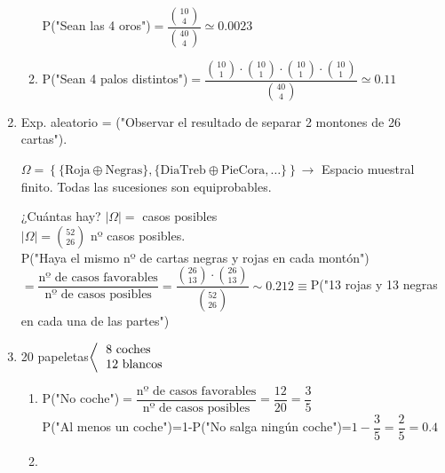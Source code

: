 \begin{enumerate}[label=\color{red}\textbf{\arabic*)}, leftmargin=*]
\begin{enumerate}[label=\color{red}\alph*)]
        P("Sean las 4 oros")$=\dfrac{\binom{10}{4}}{\binom{40}{4}}\simeq0.0023$
        \item {}
        
        P("Sean 4 palos distintos")$=\dfrac{\binom{10}{1}\cdot\binom{10}{1}\cdot\binom{10}{1}\cdot\binom{10}{1}}{\binom{40}{4}}\simeq0.11$
    \end{enumerate}
    \item {}
    
    Exp. aleatorio = ("Observar el resultado de separar 2 montones de 26 cartas").
    
    $\Omega=\left\{\{\text{Roja}\oplus\text{Negras}\},\{\text{DiaTreb}\oplus\text{PieCora},\dots\}\right\}\longrightarrow$ Espacio muestral finito. Todas las sucesiones son equiprobables. 
    
    ¿Cuántas hay? $|\Omega|=$ casos posibles\\
    $|\Omega|=\binom{52}{26}$ nº casos posibles.\\
    P("Haya el mismo nº de cartas negras y rojas en cada montón")$=\dfrac{\text{nº de casos favorables}}{\text{nº de casos posibles}}=\dfrac{\binom{26}{13}\cdot\binom{26}{13}}{\binom{52}{26}}\sim0.212\equiv$P("13 rojas y 13 negras en cada una de las partes")
    \item {}
    
    20 papeletas$\left\langle\begin{tabular}{l}
    8 coches\\
    12 blancos
    \end{tabular}\right.$
    \begin{enumerate}[label=\color{red}\alph*)]
    	\item {}
        
        P("No coche")$=\dfrac{\text{nº de casos favorables}}{\text{nº de casos posibles}}=\dfrac{12}{20}=\dfrac{3}{5}$\\
        P("Al menos un coche")=1-P("No salga ningún coche")=$1-\dfrac{3}{5}=\dfrac{2}{5}=0.4$
        \item {}
        

\end{enumerate}
\end{enumerate}
